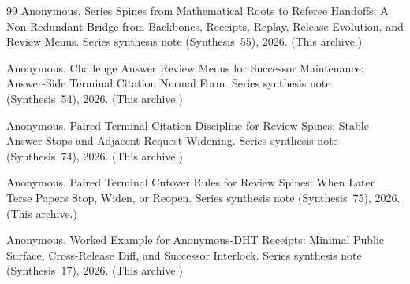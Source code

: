 \documentclass[11pt]{article}
\begin{document}
\begin{thebibliography}{99}
Anonymous.
\newblock Series Spines from Mathematical Roots to Referee Handoffs: A Non-Redundant Bridge from Backbones, Receipts, Replay, Release Evolution, and Review Menus.
\newblock Series synthesis note (Synthesis~55), 2026. (This archive.)

Anonymous.
\newblock Challenge Answer Review Menus for Successor Maintenance: Answer-Side Terminal Citation Normal Form.
\newblock Series synthesis note (Synthesis~54), 2026. (This archive.)

Anonymous.
\newblock Paired Terminal Citation Discipline for Review Spines: Stable Answer Stops and Adjacent Request Widening.
\newblock Series synthesis note (Synthesis~74), 2026. (This archive.)

Anonymous.
\newblock Paired Terminal Cutover Rules for Review Spines: When Later Terse Papers Stop, Widen, or Reopen.
\newblock Series synthesis note (Synthesis~75), 2026. (This archive.)

Anonymous.
\newblock Worked Example for Anonymous-DHT Receipts: Minimal Public Surface, Cross-Release Diff, and Successor Interlock.
\newblock Series synthesis note (Synthesis~17), 2026. (This archive.)

\end{thebibliography}
\end{document}

